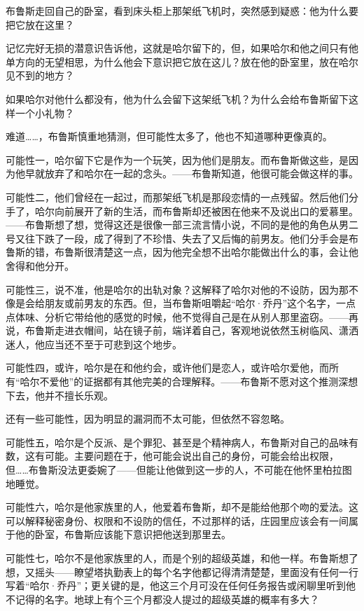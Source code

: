 \documentclass[../main.tex]{subfiles}
\begin{document}
布鲁斯走回自己的卧室，看到床头柜上那架纸飞机时，突然感到疑惑：他为什么要把它放在这里？

记忆完好无损的潜意识告诉他，这就是哈尔留下的，但，如果哈尔和他之间只有他单方向的无望相思，为什么他会下意识把它放在这儿？放在他的卧室里，放在哈尔见不到的地方？

如果哈尔对他什么都没有，他为什么会留下这架纸飞机？为什么会给布鲁斯留下这样一个小礼物？

难道……，布鲁斯慎重地猜测，但可能性太多了，他也不知道哪种更像真的。

可能性一，哈尔留下它是作为一个玩笑，因为他们是朋友。而布鲁斯做这些，是因为他早就放弃了和哈尔在一起的念头。——布鲁斯知道，他很可能会做这样的事。

可能性二，他们曾经在一起过，而那架纸飞机是那段恋情的一点残留。然后他们分手了，哈尔向前展开了新的生活，而布鲁斯却还被困在他来不及说出口的爱慕里。——布鲁斯想了想，觉得这还是很像一部三流言情小说，不同的是他的角色从男二号又往下跌了一段，成了得到了不珍惜、失去了又后悔的前男友。他们分手会是布鲁斯的错，布鲁斯很清楚这一点，因为他完全想不出哈尔能做出什么的事，会让他舍得和他分开。

可能性三，说不准，他是哈尔的出轨对象？这解释了哈尔对他的不设防，因为那不像是会给朋友或前男友的东西。但，当布鲁斯咀嚼起“哈尔·乔丹”这个名字，一点点体味、分析它带给他的感觉的时候，他不觉得自己是在从别人那里盗窃。——再说，布鲁斯走进衣帽间，站在镜子前，端详着自己，客观地说依然玉树临风、潇洒迷人，他应当还不至于可悲到这个地步。

可能性四，或许，哈尔是在和他约会，或许他们是恋人，或许哈尔爱他，而所有“哈尔不爱他”的证据都有其他完美的合理解释。——布鲁斯不愿对这个推测深想下去，他并不擅长乐观。

还有一些可能性，因为明显的漏洞而不太可能，但依然不容忽略。

可能性五，哈尔是个反派、是个罪犯、甚至是个精神病人，布鲁斯对自己的品味有数，这有可能。主要问题在于，他可能会说出自己的身份，可能会给出权限，但……布鲁斯没法更委婉了——但能让他做到这一步的人，不可能在他怀里柏拉图地睡觉。

可能性六，哈尔是他家族里的人，他爱着布鲁斯，却不是能给他那个吻的爱法。这可以解释秘密身份、权限和不设防的信任，不过那样的话，庄园里应该会有一间属于他的卧室，布鲁斯应该能下意识把他送到那里去。

可能性七，哈尔不是他家族里的人，而是个别的超级英雄，和他一样。布鲁斯想了想，又摇头——瞭望塔执勤表上的每个名字他都记得清清楚楚，里面没有任何一行写着“哈尔·乔丹”；更关键的是，他这三个月可没在任何任务报告或闲聊里听到他不记得的名字。地球上有个三个月都没人提过的超级英雄的概率有多大？
\end{document}

